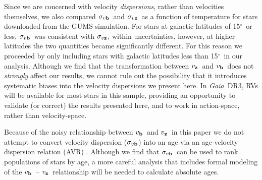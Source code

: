 \documentclass{aastex63}
\newcommand{\eg}{{\it e.g.}}
\newcommand{\gaia}{{\it Gaia}}
\newcommand{\degrees}{$^\circ$}
\newcommand{\vz}{$v_{\bf z}$}
\newcommand{\vb}{$v_{\bf b}$}
\newcommand{\sigmavb}{$\sigma_{v{\bf b}}$}
\newcommand{\sigmavz}{$\sigma_{v{\bf z}}$}
\begin{document}
Since we are concerned with velocity {\it dispersions}, rather than velocities
themselves, we also compared \sigmavb\ and \sigmavz\ as a function of
temperature for stars downloaded from the GUMS simulation.
For stars at galactic latitudes of 15\degrees\ or less, \sigmavb\ was
consistent with $\sigma_{v{\bf z}}$, within uncertainties, however, at higher
latitudes the two quantities became significantly different.
For this reason we proceeded by only including stars with galactic latitudes
less than 15\degrees\ in our analysis.
Although we find that the transformation between \vz\ and \vb\ does not {\it
strongly} affect our results, we cannot rule out the possibility that it
introduces systematic biases into the velocity dispersions we present here.
In \gaia\ DR3, RVs will be available for most stars in this sample, providing
an opportunity to validate (or correct) the results presented here, and to
work in action-space, rather than velocity-space.

Because of the noisy relationship between \vb\ and \vz\, in this paper we do
not attempt to convert velocity dispersion (\sigmavb) into an age via an
age-velocity dispersion relation (AVR) \citep[\eg][]{holmberg2009}.
Although we find that \sigmavb\ can be used to rank populations of stars by
age, a more careful analysis that includes formal modeling of the \vb\ -- \vz\
relationship will be needed to calculate absolute ages.
\end{document}
